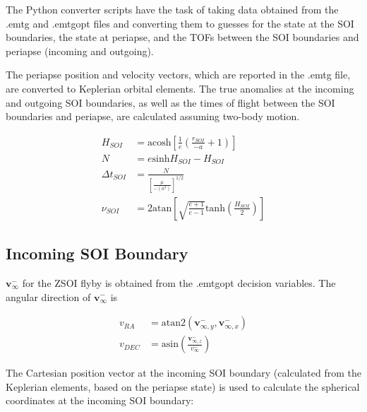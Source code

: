 \documentclass[]{article}
\newcommand{\vb}[1]{\bm{#1}} %
\begin{document}
The Python converter scripts have the task of taking data obtained from the .emtg and .emtgopt files and converting them to guesses for the state at the \ac{SOI} boundaries, the state at periapse, and the \acp{TOF} between the \ac{SOI} boundaries and periapse (incoming and outgoing).

The periapse position and velocity vectors, which are reported in the .emtg file, are converted to Keplerian orbital elements. The true anomalies at the incoming and outgoing \ac{SOI} boundaries, as well as the times of flight between the \ac{SOI} boundaries and periapse, are calculated assuming two-body motion.

\begin{align}
	H_{SOI} &= \mathrm{acosh} \left[ \frac{1}{e} \left( \frac{r_{SOI}}{-a} + 1 \right) \right] \\
	N &= e \mathrm{sinh} H_{SOI} - H_{SOI} \\
	\label{eq:tsoi}
	\Delta t_{SOI} &= \frac{N}{ \left[ \frac{\mu}{-\left( a^3 \right)} \right]^{1/2}} \\
	\nu_{SOI} &= 2 \mathrm{atan} \left[ \sqrt{\frac{e + 1}{e - 1}} \mathrm{tanh} \left( \frac{H_{SOI}}{2} \right) \right]
\end{align}


\subsection{Incoming SOI Boundary}

$\vb{v}_{\infty}^{-}$ for the \ac{ZSOI} flyby is obtained from the .emtgopt decision variables. The angular direction of $\vb{v}_{\infty}^{-}$ is

\begin{align}
v_{RA} &= \mathrm{atan2} \left( \vb{v}_{\infty, y}^{-}, \vb{v}_{\infty, x}^{-} \right) \\
v_{DEC} &= \mathrm{asin} \left( \frac{\vb{v}_{\infty, z}^{-}}{v_{\infty}^{-}} \right)
\end{align}

\noindent The Cartesian position vector at the incoming \ac{SOI} boundary (calculated from the Keplerian elements, based on the periapse state) is used to calculate the spherical coordinates at the incoming \ac{SOI} boundary:
\end{document}
